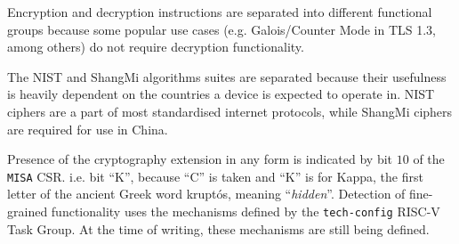 Encryption and decryption instructions are separated into different functional
groups because some popular use cases (e.g. Galois/Counter Mode in TLS 1.3, among others)
do not require decryption functionality.

The NIST and ShangMi algorithms suites are separated because their usefulness is
heavily dependent on the countries a device is expected to operate in.
NIST ciphers are a part of most standardised internet protocols, while ShangMi ciphers are
required for use in China.

Presence of the cryptography extension in any form is indicated
by bit $10$ of the {\tt MISA} CSR.
i.e. bit ``K'', because ``C'' is taken and ``K'' is for Kappa, the
first letter of the ancient Greek word kruptós,
meaning ``{\em hidden}''.
Detection of fine-grained functionality uses the mechanisms defined
by the {\tt tech-config} RISC-V Task Group.
At the time of writing, these mechanisms are still being defined.

